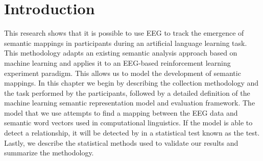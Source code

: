 \section{Introduction}

This research shows that it is possible to use EEG to track the emergence of 
semantic mappings in participants during an artificial language learning task. 
This methodology adapts an existing semantic analysis approach based on machine 
learning and applies it to an EEG-based reinforcement learning experiment 
paradigm. This allows us to model the development of semantic mappings. In this 
chapter we begin by describing the collection methodology and the task 
performed by the participants, followed by a detailed definition of the machine 
learning semantic representation model and evaluation framework. The model that 
we use attempts to find a mapping between the EEG data and semantic word 
vectors used in computational linguistics. If the model is able to detect a 
relationship, it will be detected by in a statistical test known as the \tvt 
test. Lastly, we describe the statistical methods used to validate our results 
and summarize the methodology.
